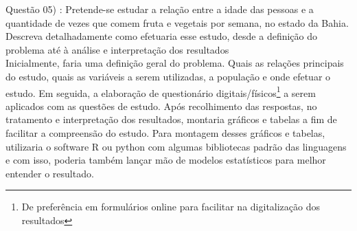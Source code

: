 
\noindent \textcolor{COLOR1}{Questão 05)} : Pretende-se estudar a relação entre a idade das pessoas e a quantidade de vezes que comem
fruta e vegetais por semana, no estado da Bahia. Descreva detalhadamente como efetuaria esse estudo, desde a definição do problema até à análise e interpretação dos resultados
\\

Inicialmente, faria uma definição geral do problema. Quais as relações principais do estudo, quais as variáveis a serem utilizadas, a população e onde efetuar o estudo. Em seguida, a elaboração de questionário digitais/físicos\footnote{De preferência em formulários online para facilitar na digitalização dos resultados} a serem aplicados com as questões de estudo. Após recolhimento das respostas, no tratamento e interpretação dos resultados, montaria gráficos e tabelas a fim de facilitar a compreensão do estudo. Para montagem desses gráficos e tabelas, utilizaria o software R ou python com algumas bibliotecas padrão das linguagens e com isso, poderia também lançar mão de modelos estatísticos para melhor entender o resultado.